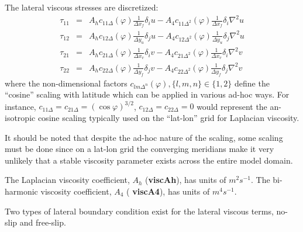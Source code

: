 The lateral viscous stresses are discretized:
\begin{eqnarray}
\tau_{11} & = & A_h c_{11\Delta}(\varphi) \frac{1}{\Delta x_f} \delta_i u
               -A_4 c_{11\Delta^2}(\varphi) \frac{1}{\Delta x_f} \delta_i \nabla^2 u \\
\tau_{12} & = & A_h c_{12\Delta}(\varphi) \frac{1}{\Delta y_u} \delta_j u
               -A_4 c_{12\Delta^2}(\varphi)\frac{1}{\Delta y_u} \delta_j \nabla^2 u \\
\tau_{21} & = & A_h c_{21\Delta}(\varphi) \frac{1}{\Delta x_v} \delta_i v
               -A_4 c_{21\Delta^2}(\varphi) \frac{1}{\Delta x_v} \delta_i \nabla^2 v \\
\tau_{22} & = & A_h c_{22\Delta}(\varphi) \frac{1}{\Delta y_f} \delta_j v
               -A_4 c_{22\Delta^2}(\varphi) \frac{1}{\Delta y_f} \delta_j \nabla^2 v
\end{eqnarray}
where the non-dimensional factors $c_{lm\Delta^n}(\varphi), \{l,m,n\} \in
\{1,2\}$ define the ``cosine'' scaling with latitude which can be
applied in various ad-hoc ways. For instance, $c_{11\Delta} =
c_{21\Delta} = (\cos{\varphi})^{3/2}$, $c_{12\Delta}=c_{22\Delta}=0$ would
represent the an-isotropic cosine scaling typically used on the
``lat-lon'' grid for Laplacian viscosity.

It should be noted that despite the ad-hoc nature of the scaling, some
scaling must be done since on a lat-lon grid the converging meridians
make it very unlikely that a stable viscosity parameter exists across
the entire model domain.

The Laplacian viscosity coefficient, $A_h$ ({\bf viscAh}), has units
of $m^2 s^{-1}$. The bi-harmonic viscosity coefficient, $A_4$ ({\bf
viscA4}), has units of $m^4 s^{-1}$.


Two types of lateral boundary condition exist for the lateral viscous
terms, no-slip and free-slip.

